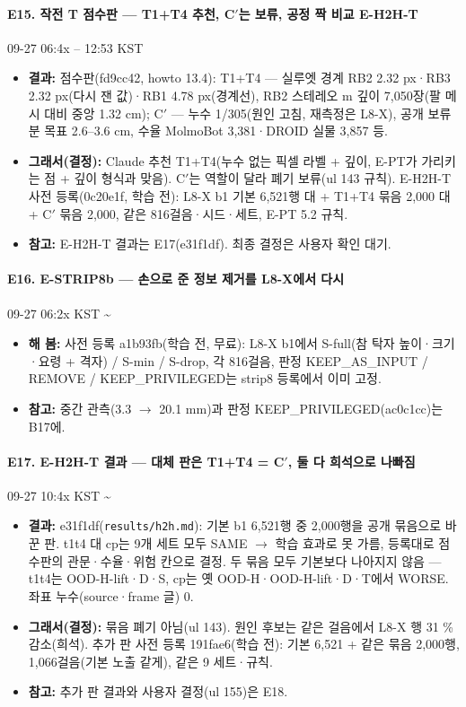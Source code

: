 \paragraph{E15. 작전 T 점수판 --- T1+T4 추천, C$'$는 보류, 공정 짝 비교 E-H2H-T}
{\small 09-27 06:4x -- 12:53 KST}
\begin{itemize}
  \item \textbf{결과:} 점수판(fd9cc42, howto 13.4): T1+T4 --- 실루엣 경계 RB2 2.32 px·RB3 2.32 px(다시 잰 값)·RB1 4.78 px(경계선), RB2 스테레오 m 깊이 7,050장(팔 메시 대비 중앙 1.32 cm); C$'$ --- 누수 1/305(원인 고침, 재측정은 L8-X), 공개 보류분 목표 2.6--3.6 cm, 수율 MolmoBot 3,381·DROID 실물 3,857 등.
  \item \textbf{그래서(결정):} Claude 추천 T1+T4(누수 없는 픽셀 라벨 + 깊이, E-PT가 가리키는 점 + 깊이 형식과 맞음). C$'$는 역할이 달라 폐기 보류(ul 143 규칙). E-H2H-T 사전 등록(0c20e1f, 학습 전): L8-X b1 기본 6,521행 대 + T1+T4 묶음 2,000 대 + C$'$ 묶음 2,000, 같은 816걸음·시드·세트, E-PT 5.2 규칙.
  \item \textbf{참고:} E-H2H-T 결과는 E17(e31f1df). 최종 결정은 사용자 확인 대기.
\end{itemize}

\paragraph{E16. E-STRIP8b --- 손으로 준 정보 제거를 L8-X에서 다시}
{\small 09-27 06:2x KST \textasciitilde{}}
\begin{itemize}
  \item \textbf{해 봄:} 사전 등록 a1b93fb(학습 전, 무료): L8-X b1에서 S-full(참 탁자 높이·크기·요령 + 격자) / S-min / S-drop, 각 816걸음, 판정 KEEP\_AS\_INPUT / REMOVE / KEEP\_PRIVILEGED는 strip8 등록에서 이미 고정.
  \item \textbf{참고:} 중간 관측(3.3 $\rightarrow$ 20.1 mm)과 판정 KEEP\_PRIVILEGED(ac0c1cc)는 B17에.
\end{itemize}

\paragraph{E17. E-H2H-T 결과 --- 대체 판은 T1+T4 = C$'$, 둘 다 희석으로 나빠짐}
{\small 09-27 10:4x KST \textasciitilde{}}
\begin{itemize}
  \item \textbf{결과:} e31f1df(\texttt{results/\allowbreak{}h2h.\allowbreak{}md}): 기본 b1 6,521행 중 2,000행을 공개 묶음으로 바꾼 판. t1t4 대 cp는 9개 세트 모두 SAME $\rightarrow$ 학습 효과로 못 가름, 등록대로 점수판의 관문·수율·위험 칸으로 결정. 두 묶음 모두 기본보다 나아지지 않음 --- t1t4는 OOD-H-lift·D·S, cp는 옛 OOD-H·OOD-H-lift·D·T에서 WORSE. 좌표 누수(source·frame 글) 0.
  \item \textbf{그래서(결정):} 묶음 폐기 아님(ul 143). 원인 후보는 같은 걸음에서 L8-X 행 31 \% 감소(희석). 추가 판 사전 등록 191fae6(학습 전): 기본 6,521 + 같은 묶음 2,000행, 1,066걸음(기본 노출 같게), 같은 9 세트·규칙.
  \item \textbf{참고:} 추가 판 결과와 사용자 결정(ul 155)은 E18.
\end{itemize}

